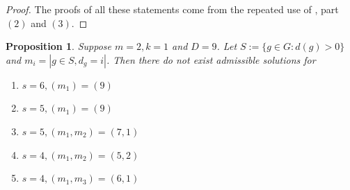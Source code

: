 \documentclass[12pt,twoside,]{amsart}
\theoremstyle{plain}
\newtheorem{proposition}[theorem]{Proposition}
\theoremstyle{definition}
\begin{document}
\begin{proof}
    The proofs of all these statements come from the repeated use of , part $(2)$ and $(3)$.
\end{proof}





\begin{proposition}\label{m = 2; k = 1; D = 9 impossibility}
Suppose $m = 2, k = 1$ and $D = 9$. Let $S:=\{g\in G : d(g)>0\}$ and $m_i = | g \in S, d_g = i|$.  Then there do not exist admissible solutions for 
\begin{enumerate}
    \item $s = 6, (m_1) = (9)$
    \item $s = 5, (m_1) = (9)$
    \item $s = 5, (m_1,m_2) = (7,1)$
    \item $s = 4,  (m_1, m_2) = (5,2)$
    \item $s = 4,  (m_1, m_3) = (6,1)$
    
\end{enumerate}
\end{proposition}
\end{document}

